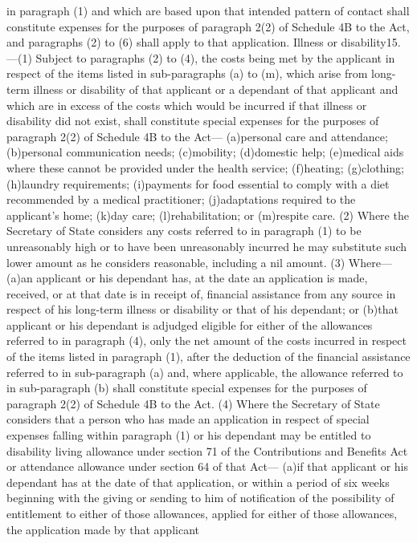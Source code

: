 \documentclass[a4paper]{article}
\begin{document}
in paragraph (1) and which are based upon that intended pattern of contact shall
constitute expenses for the purposes of paragraph 2(2) of Schedule 4B to the
Act, and paragraphs (2) to (6) shall apply to that application.
Illness or disability15.—(1) Subject to paragraphs (2) to (4), the costs being
met by the applicant in respect of the items listed in sub-paragraphs (a) to
(m), which arise from long-term illness or disability of that applicant or a
dependant of that applicant and which are in excess of the costs which would be
incurred if that illness or disability did not exist, shall constitute special
expenses for the purposes of paragraph 2(2) of Schedule 4B to the Act—
(a)personal care and attendance;
(b)personal communication needs;
(c)mobility;
(d)domestic help;
(e)medical aids where these cannot be provided under the health service;
(f)heating;
(g)clothing;
(h)laundry requirements;
(i)payments for food essential to comply with a diet recommended by a medical
practitioner;
(j)adaptations required to the applicant’s home;
(k)day care;
(l)rehabilitation; or
(m)respite care.
(2) Where the Secretary of State considers any costs referred to in paragraph
(1) to be unreasonably high or to have been unreasonably incurred he may
substitute such lower amount as he considers reasonable, including a nil amount.
(3) Where—
(a)an applicant or his dependant has, at the date an application is made,
received, or at that date is in receipt of, financial assistance from any source
in respect of his long-term illness or disability or that of his dependant; or
(b)that applicant or his dependant is adjudged eligible for either of the
allowances referred to in paragraph (4),
only the net amount of the costs incurred in respect of the items listed in
paragraph (1), after the deduction of the financial assistance referred to in
sub-paragraph (a) and, where applicable, the allowance referred to in
sub-paragraph (b) shall constitute special expenses for the purposes of
paragraph 2(2) of Schedule 4B to the Act.
(4) Where the Secretary of State considers that a person who has made an
application in respect of special expenses falling within paragraph (1) or his
dependant may be entitled to disability living allowance under section 71 of the
Contributions and Benefits Act or attendance allowance under section 64 of that
Act—
(a)if that applicant or his dependant has at the date of that application, or
within a period of six weeks beginning with the giving or sending to him of
notification of the possibility of entitlement to either of those allowances,
applied for either of those allowances, the application made by that applicant
\end{document}
